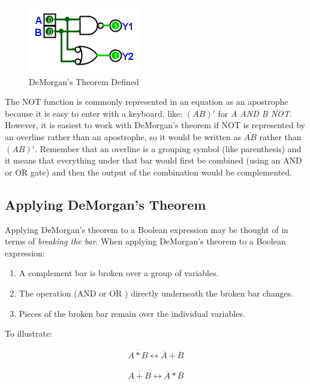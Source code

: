 \begin{figure}[H]
	\centering
	\includegraphics[width=\maxwidth{.95\linewidth}]{gfx/04_28}
	\caption{DeMorgan's Theorem Defined}
	\label{fig:04_28}
\end{figure}

The NOT function is commonly represented in an equation as an apostrophe because it is easy to enter with a keyboard, like: $ (AB)' $ for \emph{A AND B NOT}. However, it is easiest to work with DeMorgan's theorem if \textsf{NOT} is represented by an overline rather than an apostrophe, so it would be written as $ \overline{AB} $ rather than $ (AB)' $. Remember that an overline is a grouping symbol (like parenthesis) and it means that everything under that bar would first be combined (using an \textsf{AND} or \textsf{OR} gate) and then the output of the combination would be complemented.

\subsection{Applying DeMorgan's Theorem}
\label{BF:subsec:applying_demorgans_theorem}

Applying DeMorgan's theorem to a Boolean expression may be thought of in terms of \emph{breaking the bar}. When applying DeMorgan's theorem to a Boolean expression:

\begin{enumerate}
\item A complement bar is broken over a group of variables.
\item The operation (\textsf{AND}  or \textsf{OR} ) directly underneath the broken bar changes.
\item Pieces of the broken bar remain over the individual variables. 
\end{enumerate}

To illustrate:

\begin{align}
  \label{BF:eq:demorgan_nand}
  \overline{A*B} \leftrightarrow \overline{A}+\overline{B}
\end{align}

\begin{align}
  \label{BF:eq:demorgan_nor}
  \overline{A+B} \leftrightarrow \overline{A}*\overline{B}
\end{align}

